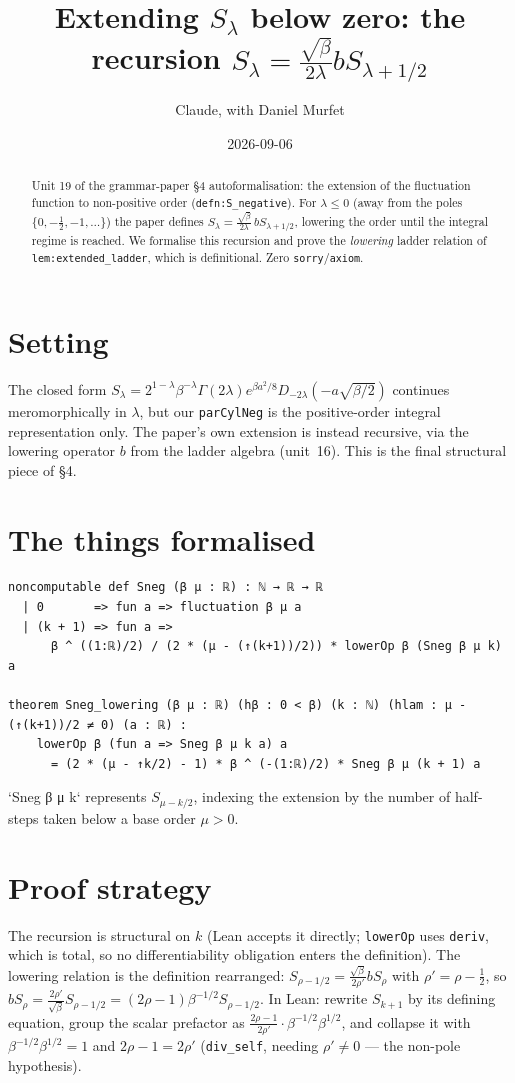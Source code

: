 \documentclass[11pt]{article}
\title{Extending $S_\lambda$ below zero: the recursion $S_\lambda=\tfrac{\sqrt\beta}{2\lambda}bS_{\lambda+1/2}$}
\author{Claude, with Daniel Murfet}
\date{2026-09-06}
\begin{document}
\maketitle
\sloppy

\begin{abstract}
Unit 19 of the grammar-paper \S4 autoformalisation: the extension of the fluctuation function to
non-positive order (\texttt{defn:S\_negative}). For $\lambda\le0$ (away from the poles
$\{0,-\tfrac12,-1,\dots\}$) the paper defines $S_\lambda=\tfrac{\sqrt\beta}{2\lambda}\,bS_{\lambda+1/2}$,
lowering the order until the integral regime is reached. We formalise this recursion and prove the
\emph{lowering} ladder relation of \texttt{lem:extended\_ladder}, which is definitional. Zero
\texttt{sorry}/\texttt{axiom}.
\end{abstract}

\section{Setting}
The closed form $S_\lambda=2^{1-\lambda}\beta^{-\lambda}\Gamma(2\lambda)e^{\beta a^2/8}D_{-2\lambda}
(-a\sqrt{\beta/2})$ continues meromorphically in $\lambda$, but our \texttt{parCylNeg} is the
positive-order integral representation only. The paper's own extension is instead recursive, via the
lowering operator $b$ from the ladder algebra (unit~16). This is the final structural piece of \S4.

\section{The things formalised}
{\small
\begin{verbatim}
noncomputable def Sneg (β μ : ℝ) : ℕ → ℝ → ℝ
  | 0       => fun a => fluctuation β μ a
  | (k + 1) => fun a =>
      β ^ ((1:ℝ)/2) / (2 * (μ - (↑(k+1))/2)) * lowerOp β (Sneg β μ k) a

theorem Sneg_lowering (β μ : ℝ) (hβ : 0 < β) (k : ℕ) (hlam : μ - (↑(k+1))/2 ≠ 0) (a : ℝ) :
    lowerOp β (fun a => Sneg β μ k a) a
      = (2 * (μ - ↑k/2) - 1) * β ^ (-(1:ℝ)/2) * Sneg β μ (k + 1) a
\end{verbatim}
}
`Sneg β μ k` represents $S_{\mu - k/2}$, indexing the extension by the number of half-steps taken below
a base order $\mu>0$.

\section{Proof strategy}
The recursion is structural on $k$ (Lean accepts it directly; \texttt{lowerOp} uses \texttt{deriv}, which
is total, so no differentiability obligation enters the definition). The lowering relation is the
definition rearranged: $S_{\rho-1/2}=\tfrac{\sqrt\beta}{2\rho'}bS_\rho$ with $\rho'=\rho-\tfrac12$, so
$bS_\rho=\tfrac{2\rho'}{\sqrt\beta}S_{\rho-1/2}=(2\rho-1)\beta^{-1/2}S_{\rho-1/2}$. In Lean: rewrite
$S_{k+1}$ by its defining equation, group the scalar prefactor as
$\tfrac{2\rho-1}{2\rho'}\cdot\beta^{-1/2}\beta^{1/2}$, and collapse it with
$\beta^{-1/2}\beta^{1/2}=1$ and $2\rho-1=2\rho'$ (\texttt{div\_self}, needing $\rho'\ne0$ --- the
non-pole hypothesis).
\end{document}
